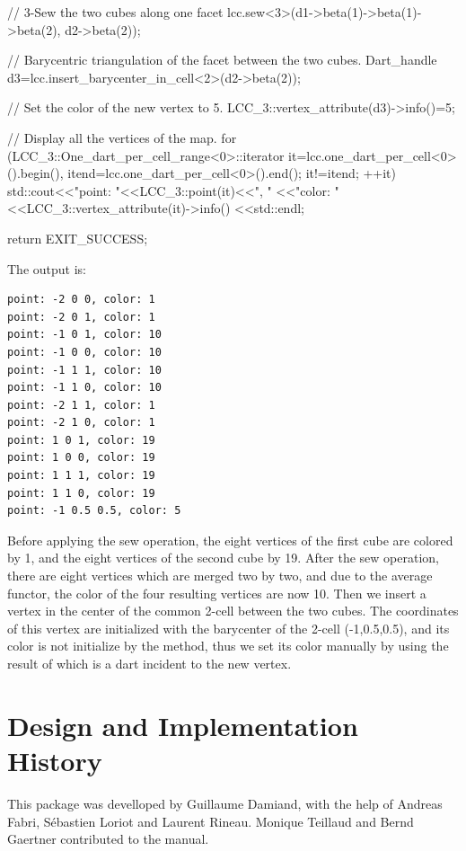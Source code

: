\begin{ccExampleCode}
{  // 3-Sew the two cubes along one facet
  lcc.sew<3>(d1->beta(1)->beta(1)->beta(2), d2->beta(2));

  // Barycentric triangulation of the facet between the two cubes.
  Dart_handle d3=lcc.insert_barycenter_in_cell<2>(d2->beta(2));

  // Set the color of the new vertex to 5.
  LCC_3::vertex_attribute(d3)->info()=5;
  
  // Display all the vertices of the map.
  for (LCC_3::One_dart_per_cell_range<0>::iterator 
       it=lcc.one_dart_per_cell<0>().begin(), 
       itend=lcc.one_dart_per_cell<0>().end(); 
       it!=itend; ++it)
    {
      std::cout<<"point: "<<LCC_3::point(it)<<", "
               <<"color: "<<LCC_3::vertex_attribute(it)->info()
               <<std::endl;
    }

  return EXIT_SUCCESS;
}
\end{ccExampleCode}

The output is:
\begin{verbatim}
point: -2 0 0, color: 1
point: -2 0 1, color: 1
point: -1 0 1, color: 10
point: -1 0 0, color: 10
point: -1 1 1, color: 10
point: -1 1 0, color: 10
point: -2 1 1, color: 1
point: -2 1 0, color: 1
point: 1 0 1, color: 19
point: 1 0 0, color: 19
point: 1 1 1, color: 19
point: 1 1 0, color: 19
point: -1 0.5 0.5, color: 5
\end{verbatim}

Before applying the sew operation, the eight vertices of the first
cube are colored by 1, and the eight vertices of the second cube by
19. After the sew operation, there are eight vertices which are merged
two by two, and due to the average functor, the color of the four
resulting vertices are now 10. Then we insert a vertex in the center
of the common 2-cell between the two cubes.  The coordinates of this
vertex are initialized with the barycenter of the 2-cell
(-1,0.5,0.5), and its color is not initialize by the method, thus we
set its color manually by using the result of
 which is a dart incident to the
new vertex.

\section{Design and Implementation History}
%
This package was develloped by Guillaume Damiand, with the help of
Andreas Fabri, S\'ebastien Loriot and Laurent Rineau.  Monique
Teillaud and Bernd Gaertner contributed to the manual.
